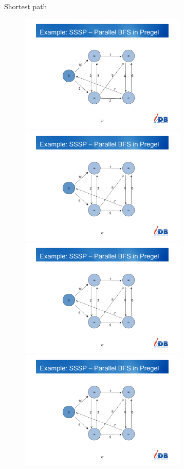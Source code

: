 \begin{frame}{Shortest path}
\begin{figure}
\begin{overprint}
\centering\includegraphics[width=8cm,page=1]{figs/12/shortest.pdf}
\centering\includegraphics[width=8cm,page=2]{figs/12/shortest.pdf}
\centering\includegraphics[width=8cm,page=3]{figs/12/shortest.pdf}
\centering\includegraphics[width=8cm,page=4]{figs/12/shortest.pdf}

\end{overprint}
\end{figure}
\end{frame}
